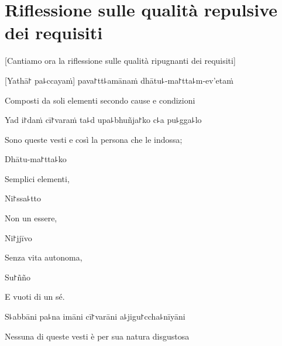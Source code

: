 \chapter[Qualità ripugnanti dei requisiti]{Riflessione sulle qualità repulsive dei requisiti}


\begin{leader}
\end{leader}

\begin{english}
  [Cantiamo ora la riflessione sulle qualità ripugnanti dei requisiti]
\end{english}

[Yathā꜓ pa꜕ccayaṁ] pava꜓tt꜕amānaṁ dhātu꜕-ma꜓tta꜕m-ev'etaṁ

\begin{english}
Composti da soli elementi secondo cause e condizioni
\end{english}

Yad i꜓daṁ cī꜓varaṁ ta꜕d upa꜕bhuñja꜓ko c꜕a pu꜕gga꜕lo

\begin{english}
Sono queste vesti e così la persona che le indossa;
\end{english}

Dhātu-ma꜓tta꜕ko

\begin{english}
Semplici elementi,
\end{english}

Ni꜓ssa꜕tto

\begin{english}
Non un essere,
\end{english}

Ni꜓jjīvo

\begin{english}
Senza vita autonoma,
\end{english}

Su꜓ñño

\begin{english}
E vuoti di un sé.
\end{english}

S꜕abbāni pa꜕na imāni cī꜓varāni a꜕jigu꜓ccha꜕nīyāni

\begin{english}
Nessuna di queste vesti è per sua natura disgustosa
\end{english}

